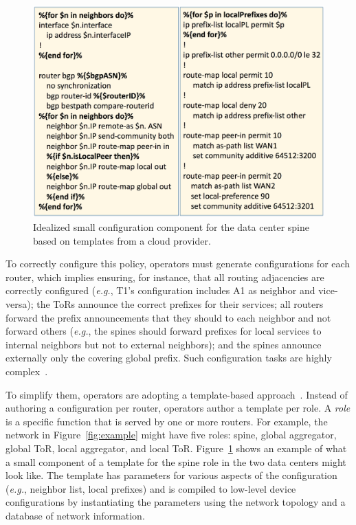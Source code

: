 \documentclass[numbers, 10pt]{sigplanconf}
\newcommand{\EG}{\emph{e.g.}}
\begin{document}
\begin{figure}[t!]
  \centering
  \includegraphics[width=\columnwidth]{figures/templates}
  \caption{Idealized small configuration component for the data center spine based on templates from a cloud provider.}
  \label{fig:templates}
  \vspace{-.8em}
\end{figure}


To correctly configure this policy, operators must generate configurations for each router, which implies ensuring, for instance, that all routing adjacencies are correctly configured (\EG, T1's configuration includes A1 as neighbor and vice-versa); the ToRs announce the correct prefixes for their services; all routers  forward the prefix announcements that they should to each neighbor and not forward others (\EG, the spines should forward prefixes for local services to internal neighbors but not to external neighbors); and the spines announce externally only the covering global prefix. Such configuration tasks are highly complex~\cite{juniper-study,bgpmon,batfish,propane}.

To simplify them, operators are adopting a template-based approach~\cite{hatch,thwack}. Instead of authoring a configuration per router, operators author a template per role.
%
A {\em role} is a specific function that is served by one or more routers.
%
For example, the network in Figure~\ref{fig:example} might have five roles: spine, global aggregator, global ToR, local aggregator, and local ToR.
%
Figure~\ref{fig:templates} shows an example of what a small component of a template for the spine role in the two data centers might look like. The template has parameters for various aspects of the configuration (\EG, neighbor list, local prefixes) and is compiled to low-level device configurations by instantiating the parameters using the network topology and a database of network information.
\end{document}
